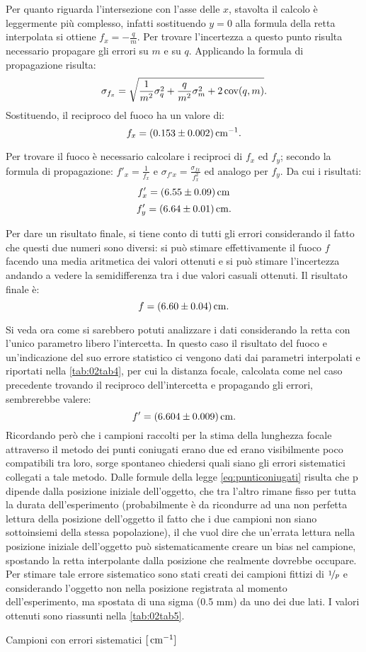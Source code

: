 Per quanto riguarda l'intersezione con l'asse delle $x$, stavolta il calcolo è leggermente più complesso, infatti sostituendo $y = 0$
 alla formula della retta interpolata si ottiene $f_x = -\frac{q}{m}$.  Per trovare l'incertezza a questo punto risulta necessario
 propagare gli errori su $m$ e su $q$. Applicando la formula di propagazione risulta:
\[\sigma_{f_x} = \sqrt {\frac{1} {m^2} \sigma_q^2 + \frac{q}{m^2} \sigma_m^2 + 2 \operatorname{cov} (q,m) }.\] 
 Sostituendo, il reciproco del fuoco ha un valore di:
\[f_x = (0.153 \pm 0.002) \,\mathrm{cm}^{-1}.\]

Per trovare il fuoco è necessario calcolare i reciproci di $f_x$ ed $f_y$; secondo la formula di 
propagazione: $f'_x = \frac{1}{f_x}$ e $\sigma_{f'x} = \frac{\sigma_{fx}}{f_{x}^2}$ ed analogo per $f_y$. Da cui i risultati:
\[f'_x = (6.55 \pm 0.09) \,\mathrm{cm} \]
\[f'_y = (6.64 \pm 0.01) \,\mathrm{cm} .\]

Per dare un risultato finale, si tiene conto di tutti gli errori considerando il fatto che questi due numeri sono diversi: si può 
 stimare effettivamente il fuoco $f$ facendo una media aritmetica dei valori ottenuti e si può stimare l'incertezza
 andando a vedere la
 semidifferenza tra i due valori casuali ottenuti. Il risultato finale è:
\[f = (6.60 \pm 0.04) \,\mathrm{cm} .\]

Si veda ora come si sarebbero potuti analizzare i dati considerando la retta con l'unico parametro libero l'intercetta. In questo
 caso il risultato del fuoco e un'indicazione del suo errore statistico ci vengono dati dai parametri interpolati e
 riportati nella \autoref{tab:02tab4}, per cui la distanza focale, calcolata come nel caso precedente trovando il reciproco
 dell'intercetta e propagando gli errori, sembrerebbe valere:
\[f' = (6.604 \pm 0.009) \,\mathrm{cm} .\]
Ricordando però che i campioni raccolti per la stima della lunghezza focale attraverso il metodo dei punti coniugati erano due ed
 erano visibilmente poco compatibili tra loro, sorge spontaneo chiedersi quali siano gli errori sistematici collegati a tale metodo.
 Dalle formule della legge \eqref{eq:punticoniugati} risulta che p dipende dalla posizione iniziale dell'oggetto, che tra
 l'altro rimane fisso per tutta la durata dell'esperimento (probabilmente è da ricondurre ad una non perfetta lettura della posizione
 dell'oggetto il fatto che i due campioni non siano sottoinsiemi della stessa popolazione), il che vuol dire che un'errata lettura
 nella posizione iniziale dell'oggetto può sistematicamente creare un bias nel campione, spostando la retta interpolante dalla
 posizione che realmente dovrebbe occupare. Per stimare tale errore sistematico sono stati creati dei campioni fittizi di $\nicefrac{1}{p}$ e
 considerando l'oggetto non nella posizione registrata al momento dell'esperimento, ma spostata di una sigma (0.5 mm) da
 uno dei due lati. I valori ottenuti sono riassunti nella \autoref{tab:02tab5}.
\begin{tabella}
	\centering
	
	\caption{Campioni con errori sistematici $[\,\mathrm{cm}^{-1}]$}
	\label{tab:02tab5}
\end{tabella}

